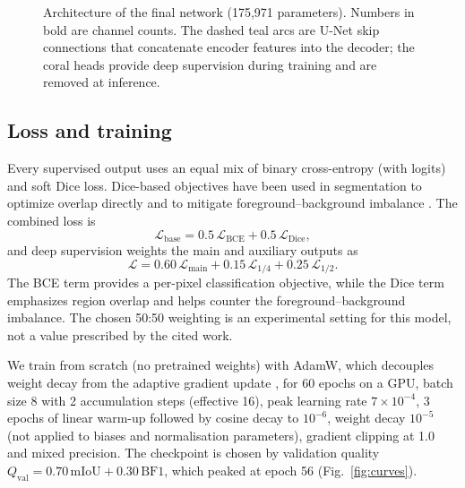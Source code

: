 \documentclass[10pt,a4paper,twocolumn]{article}
\begin{document}
\begin{figure}[t]
{}
\caption{Architecture of the final network (175{,}971 parameters). Numbers in bold are channel counts. The dashed teal arcs are U-Net skip connections that concatenate encoder features into the decoder; the coral heads provide deep supervision during training and are removed at inference.}
\label{fig:arch}
\end{figure}

\subsection{Loss and training}
Every supervised output uses an equal mix of binary cross-entropy (with logits) and soft Dice loss. Dice-based objectives have been used in segmentation to optimize overlap directly and to mitigate foreground--background imbalance \cite{milletari2016vnet}. The combined loss is
\begin{equation}
\mathcal{L}_{\text{base}} = 0.5\,\mathcal{L}_{\text{BCE}} + 0.5\,\mathcal{L}_{\text{Dice}},
\end{equation}
and deep supervision weights the main and auxiliary outputs as
\begin{equation}
\mathcal{L} = 0.60\,\mathcal{L}_{\text{main}} + 0.15\,\mathcal{L}_{1/4} + 0.25\,\mathcal{L}_{1/2}.
\end{equation}
The BCE term provides a per-pixel classification objective, while the Dice term emphasizes region overlap and helps counter the foreground--background imbalance. The chosen 50:50 weighting is an experimental setting for this model, not a value prescribed by the cited work.

We train from scratch (no pretrained weights) with AdamW, which decouples weight decay from the adaptive gradient update \cite{loshchilov2019adamw}, for 60 epochs on a GPU, batch size 8 with 2 accumulation steps (effective 16), peak learning rate $7{\times}10^{-4}$, 3 epochs of linear warm-up followed by cosine decay to $10^{-6}$, weight decay $10^{-5}$ (not applied to biases and normalisation parameters), gradient clipping at 1.0 and mixed precision. The checkpoint is chosen by validation quality $Q_{\text{val}}=0.70\,\mathrm{mIoU}+0.30\,\mathrm{BF1}$, which peaked at epoch 56 (Fig.~\ref{fig:curves}).
\end{document}
